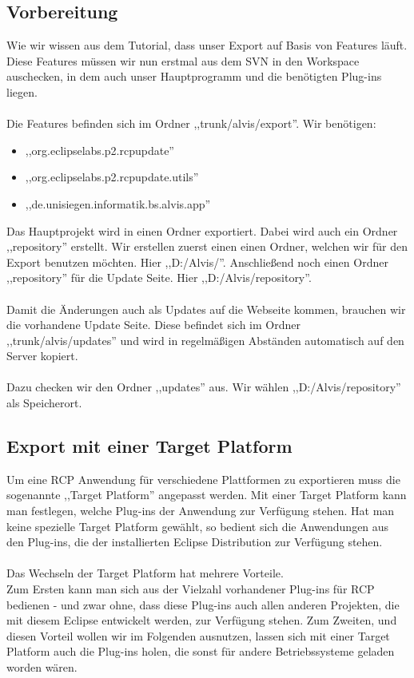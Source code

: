 \documentclass[10pt,a4paper,oneside]{scrbook}
\begin{document}
\subsection{Vorbereitung}
Wie wir wissen aus dem Tutorial, dass unser Export auf Basis von Features läuft. Diese Features müssen wir nun erstmal aus dem SVN in den Workspace auschecken, in dem auch unser Hauptprogramm und die benötigten Plug-ins liegen.
\\ \\
Die Features befinden sich im Ordner ,,trunk/alvis/export''.
Wir benötigen:
\begin{itemize}
\item ,,org.eclipselabs.p2.rcpupdate''
\item ,,org.eclipselabs.p2.rcpupdate.utils''
\item ,,de.unisiegen.informatik.bs.alvis.app''
\end{itemize}

Das Hauptprojekt wird in einen Ordner exportiert. Dabei wird auch ein Ordner ,,repository'' erstellt. Wir erstellen zuerst einen einen Ordner, welchen wir für den Export benutzen möchten. Hier ,,D:/Alvis/''. Anschließend noch einen Ordner ,,repository'' für die Update Seite. Hier ,,D:/Alvis/repository''.
\\ \\
Damit die Änderungen auch als Updates auf die Webseite kommen, brauchen wir die vorhandene Update Seite. Diese befindet sich im Ordner ,,trunk/alvis/updates'' und wird in regelmäßigen Abständen automatisch auf den Server kopiert. 
\\ \\
Dazu checken wir den Ordner ,,updates'' aus. Wir wählen ,,D:/Alvis/repository'' als Speicherort.
\subsection{Export mit einer Target Platform}
Um eine RCP Anwendung für verschiedene Plattformen zu exportieren muss die sogenannte ,,Target Platform'' angepasst werden. Mit einer Target Platform kann man festlegen, welche Plug-ins der Anwendung zur Verfügung stehen. Hat man keine spezielle Target Platform gewählt, so bedient sich die Anwendungen aus den Plug-ins, die der installierten Eclipse Distribution zur Verfügung stehen.
\\
\\
Das Wechseln der Target Platform hat mehrere Vorteile. \\
Zum Ersten kann man sich aus der Vielzahl vorhandener Plug-ins für RCP bedienen - und zwar ohne, dass diese Plug-ins auch allen anderen Projekten, die mit diesem Eclipse entwickelt werden, zur Verfügung stehen.
Zum Zweiten, und diesen Vorteil wollen wir im Folgenden ausnutzen, lassen sich mit einer Target Platform auch die Plug-ins holen, die sonst für andere Betriebssysteme geladen worden wären.
\end{document}
